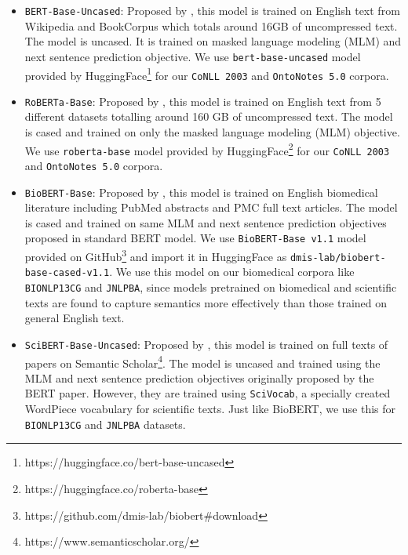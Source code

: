 \begin{itemize}
    \item \texttt{BERT-Base-Uncased}: Proposed by \cite{devlin2018bert}, this model is trained on English text from Wikipedia and BookCorpus\cite{moviebook} which totals around 16GB of uncompressed text. The model is uncased. It is trained on masked language modeling (MLM) and next sentence prediction objective. We use \texttt{bert-base-uncased} model provided by HuggingFace\footnote{https://huggingface.co/bert-base-uncased} for our \texttt{CoNLL 2003} and \texttt{OntoNotes 5.0} corpora.
    
    \item \texttt{RoBERTa-Base}: Proposed by \cite{}, this model is trained on English text from 5 different datasets totalling around 160 GB of uncompressed text. The model is cased and trained on only the masked language modeling (MLM) objective. We use \texttt{roberta-base} model provided by HuggingFace\footnote{https://huggingface.co/roberta-base} for our \texttt{CoNLL 2003} and \texttt{OntoNotes 5.0} corpora.
    
    \item \texttt{BioBERT-Base}: Proposed by \cite{}, this model is trained on English biomedical literature including PubMed abstracts and PMC full text articles. The model is cased and trained on same MLM and next sentence prediction objectives proposed in standard BERT model. We use \texttt{BioBERT-Base v1.1} model provided on GitHub\footnote{https://github.com/dmis-lab/biobert\#download} and import it in HuggingFace as \texttt{dmis-lab/biobert-base-cased-v1.1}. We use this model on our biomedical corpora like \texttt{BIONLP13CG} and \texttt{JNLPBA}, since models pretrained on biomedical and scientific texts are found to capture semantics more effectively than those trained on general English text.
    
    \item \texttt{SciBERT-Base-Uncased}: Proposed by \cite{}, this model is trained on full texts of papers on Semantic Scholar\footnote{https://www.semanticscholar.org/}. The model is uncased and trained using the MLM and next sentence prediction objectives originally proposed by the BERT paper. However, they are trained using \texttt{SciVocab}, a specially created WordPiece vocabulary for scientific texts. Just like BioBERT, we use this for \texttt{BIONLP13CG} and \texttt{JNLPBA} datasets.
    
\end{itemize}


